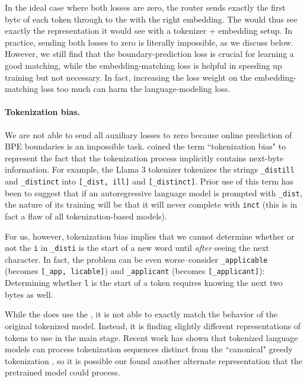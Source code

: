In the ideal case where both losses are zero, the router sends exactly the first byte of each token through to the \main{} with the right embedding.
The \main{} would thus see exactly the representation it would see with a tokenizer + embedding setup.
In practice, sending both losses to zero is literally impossible, as we discuss below.
However, we still find that the boundary-prediction loss is crucial for learning a good matching, while the embedding-matching loss is helpful in speeding up training but not necessary.
In fact, increasing the loss weight on the embedding-matching loss too much can harm the language-modeling loss.

\paragraph{Tokenization bias.} We are not able to send all auxiliary losses to zero because online prediction of BPE boundaries is an impossible task.
\citet{phan2025exact} coined the term ``tokenization bias" to represent the fact that the tokenization process implicitly contains next-byte information.
For example, the Llama 3 tokenizer tokenizes the strings \texttt{\_distill} and \texttt{\_distinct} into \texttt{[\_dist, ill]} and \texttt{[\_distinct]}.
Prior use of this term has been to suggest that if an autoregressive language model is prompted with \texttt{\_dist}, the nature of its training will be that it will never complete with \texttt{inct} (this is in fact a flaw of all tokenization-based models).

For us, however, tokenization bias implies that we cannot determine whether or not the \texttt{i} in \texttt{\_disti} is the start of a new word until \emph{after} seeing the next character.
In fact, the problem can be even worse--consider \texttt{\_applicable} (becomes \texttt{[\_app, licable]}) and \texttt{\_applicant} (becomes \texttt{[\_applicant]}): Determining whether \texttt{l} is the start of a token requires knowing the next two bytes as well.

While the \model{} does use the \main{}, it is not able to exactly match the behavior of the original tokenized model.
Instead, it is finding slightly different representations of tokens to use in the main stage. 
Recent work has shown that tokenized language models can process tokenization sequences distinct from the ``canonical" greedy tokenization \citep{vieira2024language}, so it is possible our \model{} found another alternate representation that the pretrained model could process.

